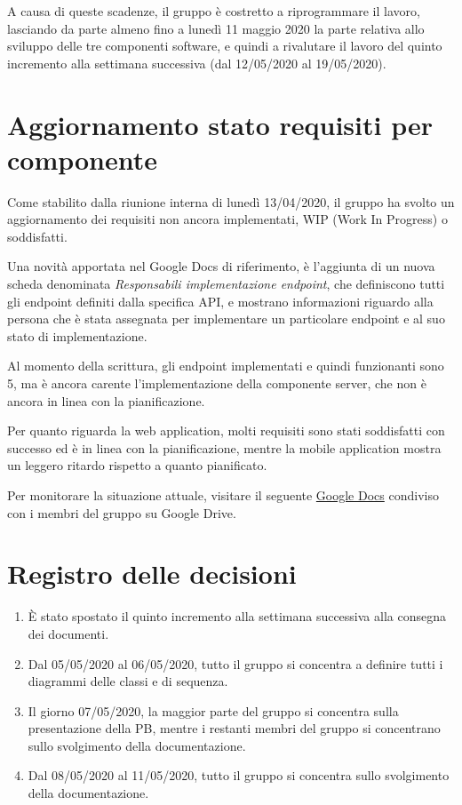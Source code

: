 \documentclass{article}
\begin{document}
A causa di queste scadenze, il gruppo è costretto a riprogrammare il lavoro, lasciando da parte almeno fino a lunedì 11 maggio 2020 la parte relativa allo sviluppo delle tre componenti software, e quindi a rivalutare il lavoro del quinto incremento alla settimana successiva (dal 12/05/2020 al 19/05/2020).

\section{Aggiornamento stato requisiti per componente}%
\label{sec:aggiornamento_stato_requisiti_per_componente}

Come stabilito dalla riunione interna di lunedì 13/04/2020, il gruppo ha svolto un aggiornamento dei requisiti non ancora implementati, WIP (Work In Progress) o soddisfatti.

Una novità apportata nel Google Docs di riferimento, è l'aggiunta di un nuova scheda denominata \textit{Responsabili implementazione endpoint}, che definiscono tutti gli endpoint definiti dalla specifica API, e mostrano informazioni riguardo alla persona che è stata assegnata per implementare un particolare endpoint e al suo stato di implementazione.

Al momento della scrittura, gli endpoint implementati e quindi funzionanti sono 5, ma è ancora carente l'implementazione della componente server, che non è ancora in linea con la pianificazione.

Per quanto riguarda la web application, molti requisiti sono stati soddisfatti con successo ed è in linea con la pianificazione, mentre la mobile application mostra un leggero ritardo rispetto a quanto pianificato.

Per monitorare la situazione attuale, visitare il seguente \href{https://docs.google.com/spreadsheets/d/1J-RbNrb1yN_X1rVlKzpP9rjaiGst8B62k1K6EHY-grU/edit#gid=0}{Google Docs} condiviso con i membri del gruppo su Google Drive.

\newpage
\section{Registro delle decisioni}%
\label{sec:registro_delle_decisioni}

\begin{enumerate}
  \item È stato spostato il quinto incremento alla settimana successiva alla consegna dei documenti.
  \item Dal 05/05/2020 al 06/05/2020, tutto il gruppo si concentra a definire tutti i diagrammi delle classi e di sequenza.
  \item Il giorno 07/05/2020, la maggior parte del gruppo si concentra sulla presentazione della PB, mentre i restanti membri del gruppo si concentrano sullo svolgimento della documentazione.
  \item Dal 08/05/2020 al 11/05/2020, tutto il gruppo si concentra sullo svolgimento della documentazione. 
\end{enumerate}

\end{document}
